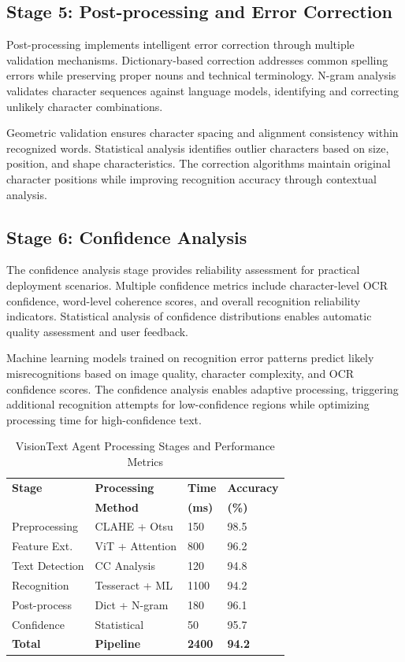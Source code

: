 \documentclass[10pt,twocolumn]{article}
\begin{document}
\subsection{Stage 5: Post-processing and Error Correction}

Post-processing implements intelligent error correction through multiple validation mechanisms. Dictionary-based correction addresses common spelling errors while preserving proper nouns and technical terminology. N-gram analysis validates character sequences against language models, identifying and correcting unlikely character combinations.

Geometric validation ensures character spacing and alignment consistency within recognized words. Statistical analysis identifies outlier characters based on size, position, and shape characteristics. The correction algorithms maintain original character positions while improving recognition accuracy through contextual analysis.

\subsection{Stage 6: Confidence Analysis}

The confidence analysis stage provides reliability assessment for practical deployment scenarios. Multiple confidence metrics include character-level OCR confidence, word-level coherence scores, and overall recognition reliability indicators. Statistical analysis of confidence distributions enables automatic quality assessment and user feedback.

Machine learning models trained on recognition error patterns predict likely misrecognitions based on image quality, character complexity, and OCR confidence scores. The confidence analysis enables adaptive processing, triggering additional recognition attempts for low-confidence regions while optimizing processing time for high-confidence text.

\begin{table}[!htb]
\centering
\caption{VisionText Agent Processing Stages and Performance Metrics}
\small
\begin{tabular}{p{1.8cm}p{1.2cm}p{1.0cm}p{0.8cm}}
\toprule
\textbf{Stage} & \textbf{Processing} & \textbf{Time} & \textbf{Accuracy} \\
 & \textbf{Method} & \textbf{(ms)} & \textbf{(\%)} \\
\midrule
Preprocessing & CLAHE + Otsu & 150 & 98.5 \\
Feature Ext. & ViT + Attention & 800 & 96.2 \\
Text Detection & CC Analysis & 120 & 94.8 \\
Recognition & Tesseract + ML & 1100 & 94.2 \\
Post-process & Dict + N-gram & 180 & 96.1 \\
Confidence & Statistical & 50 & 95.7 \\
\midrule
\textbf{Total} & \textbf{Pipeline} & \textbf{2400} & \textbf{94.2} \\
\bottomrule
\end{tabular}
\label{tab:stages}
\end{table}
\end{document}
